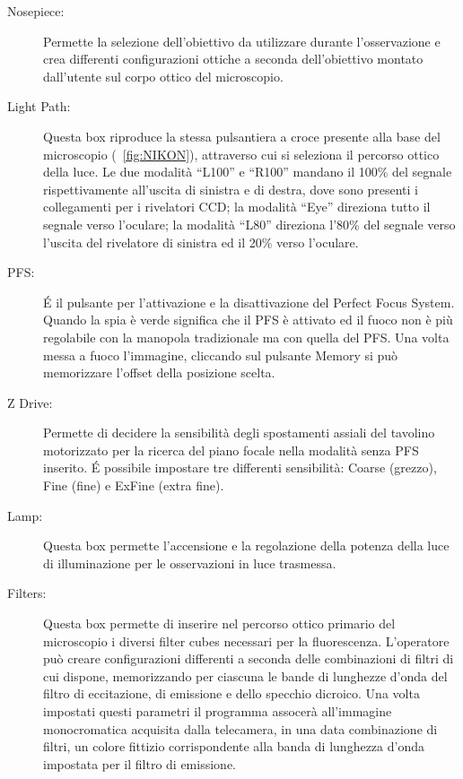 \begin{description}
\item[Nosepiece:]
Permette la selezione dell'obiettivo da utilizzare durante l'osservazione e crea differenti configurazioni ottiche a seconda dell'obiettivo montato dall'utente sul corpo ottico del microscopio.

\item[Light Path:]
Questa box riproduce la stessa pulsantiera a croce presente alla base del microscopio (\figurename~\ref{fig:NIKON}), attraverso cui si seleziona il percorso ottico della luce. 
Le due modalità ``L100'' e ``R100'' mandano il 100\% del segnale rispettivamente all'uscita di sinistra e di destra, dove sono presenti i collegamenti per i rivelatori CCD; la modalità ``Eye'' direziona tutto il segnale verso l'oculare; la modalità ``L80'' direziona l'80\% del segnale verso l'uscita del rivelatore di sinistra ed il 20\% verso l'oculare.

\item[PFS:]
\'E il pulsante per l'attivazione e la disattivazione del Perfect Focus System. 
Quando la spia è verde significa che il PFS è attivato ed il fuoco non è più regolabile con la manopola tradizionale ma con quella del PFS. 
Una volta messa a fuoco l'immagine, cliccando sul pulsante Memory si può memorizzare l'offset della posizione scelta.

\item[Z Drive:]
Permette di decidere la sensibilità degli spostamenti assiali del tavolino motorizzato per la ricerca del piano focale nella modalità senza PFS inserito.
\'E possibile impostare tre differenti sensibilità: Coarse (grezzo), Fine (fine) e ExFine (extra fine).

\item[Lamp:]
Questa box permette l'accensione e la regolazione della potenza della luce di illuminazione per le osservazioni in luce trasmessa.

\item[Filters:]
Questa box permette di inserire nel percorso ottico primario del microscopio i diversi filter cubes necessari per la fluorescenza.
L'operatore può creare configurazioni differenti a seconda delle combinazioni di filtri di cui dispone, memorizzando per ciascuna le bande di lunghezze d'onda del filtro di eccitazione, di emissione e dello specchio dicroico.
Una volta impostati questi parametri il programma assocerà all'immagine monocromatica acquisita dalla telecamera, in una data combinazione di filtri, un colore fittizio corrispondente alla banda di lunghezza d'onda impostata per il filtro di emissione.
\end{description}

